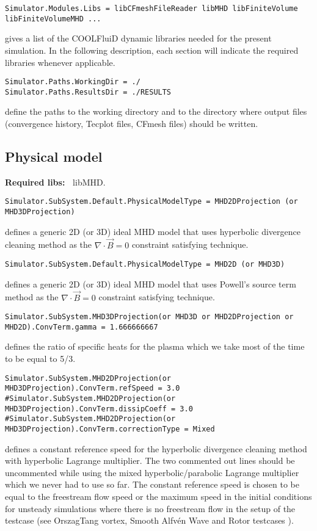 \documentclass[11pt]{article}
\begin{document}
\begin{lstlisting}[breaklines]
Simulator.Modules.Libs = libCFmeshFileReader libMHD libFiniteVolume libFiniteVolumeMHD ...
\end{lstlisting}
gives a list of the COOLFluiD dynamic libraries needed for the present simulation. In the following description, 
each section will indicate the required libraries whenever applicable.

\begin{lstlisting}[breaklines]
Simulator.Paths.WorkingDir = ./
Simulator.Paths.ResultsDir = ./RESULTS
\end{lstlisting}
define the paths to the working directory and to the directory where output files (convergence history, Tecplot files, CFmesh files) should be written. 

\subsection{Physical model}

{\bf Required libs:~} libMHD.

\begin{lstlisting}[breaklines]
Simulator.SubSystem.Default.PhysicalModelType = MHD2DProjection (or MHD3DProjection)
\end{lstlisting}
defines a generic 2D (or 3D) ideal MHD model that uses hyperbolic divergence cleaning method as the $\nabla\cdot\vec{B}=0$ constraint satisfying technique.

\begin{lstlisting}[breaklines]
Simulator.SubSystem.Default.PhysicalModelType = MHD2D (or MHD3D)
\end{lstlisting}
defines a generic 2D (or 3D) ideal MHD model that uses Powell's source term method as the $\nabla\cdot\vec{B}=0$ constraint satisfying technique.

\begin{lstlisting}[breaklines]
Simulator.SubSystem.MHD3DProjection(or MHD3D or MHD2DProjection or MHD2D).ConvTerm.gamma = 1.666666667
\end{lstlisting}
defines the ratio of specific heats for the plasma which we take most of the time to be equal to 5/3.

\begin{lstlisting}[breaklines]
Simulator.SubSystem.MHD2DProjection(or MHD3DProjection).ConvTerm.refSpeed = 3.0
#Simulator.SubSystem.MHD2DProjection(or MHD3DProjection).ConvTerm.dissipCoeff = 3.0
#Simulator.SubSystem.MHD2DProjection(or MHD3DProjection).ConvTerm.correctionType = Mixed
\end{lstlisting}
defines a constant reference speed for the hyperbolic divergence cleaning method with hyperbolic Lagrange multiplier. The two commented out lines should be uncommented while using the mixed hyperbolic/parabolic Lagrange multiplier \cite{dedner02} which we never had to use so far. The constant reference speed is chosen to be equal to the freestream flow speed or the maximum speed in the initial conditions for unsteady simulations where there is no freestream flow in the setup of the testcase (see OrszagTang vortex, Smooth Alfv\'en Wave and Rotor testcases \cite{yalim11jcp}).  
\end{document}
